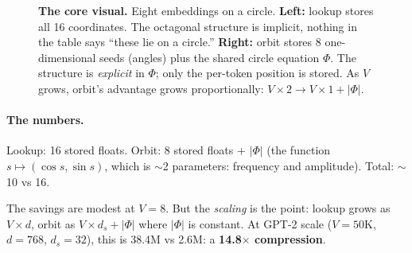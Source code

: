 \documentclass[11pt, a4paper]{article}
\theoremstyle{remark}
\begin{document}
\begin{figure}[h]
\caption{\textbf{The core visual.}
Eight embeddings on a circle.
\textbf{Left:} lookup stores all 16 coordinates.
The octagonal structure is implicit, nothing in the table says ``these lie on a circle.''
\textbf{Right:} orbit stores 8 one-dimensional seeds (angles) plus the shared circle equation $\Phi$.
The structure is \emph{explicit} in $\Phi$; only the per-token position is stored.
As $V$ grows, orbit's advantage grows proportionally: $V \times 2 \to V \times 1 + |\Phi|$.}
\label{fig:circle-example}
\end{figure}

\paragraph{The numbers.}
Lookup: 16 stored floats.
Orbit: 8 stored floats + $|\Phi|$ (the function $s \mapsto (\cos s, \sin s)$, which is $\sim$2 parameters: frequency and amplitude).
Total: $\sim$10 vs 16.

The savings are modest at $V{=}8$.
But the \emph{scaling} is the point: lookup grows as $V \times d$, orbit as $V \times d_s + |\Phi|$ where $|\Phi|$ is constant.
At GPT-2 scale ($V{=}50\text{K}$, $d{=}768$, $d_s{=}32$), this is 38.4M vs 2.6M: a \textbf{14.8$\times$ compression}.
\end{document}
